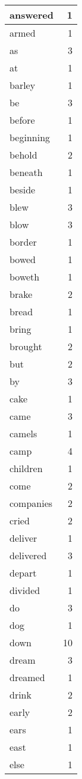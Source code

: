 \begin{center}
\begin{longtable}{l|r}
answered & 1\\ \hline 
armed & 1\\ \hline 
as & 3\\ \hline 
at & 1\\ \hline 
barley & 1\\ \hline 
be & 3\\ \hline 
before & 1\\ \hline 
beginning & 1\\ \hline 
behold & 2\\ \hline 
beneath & 1\\ \hline 
beside & 1\\ \hline 
blew & 3\\ \hline 
blow & 3\\ \hline 
border & 1\\ \hline 
bowed & 1\\ \hline 
boweth & 1\\ \hline 
brake & 2\\ \hline 
bread & 1\\ \hline 
bring & 1\\ \hline 
brought & 2\\ \hline 
but & 2\\ \hline 
by & 3\\ \hline 
cake & 1\\ \hline 
came & 3\\ \hline 
camels & 1\\ \hline 
camp & 4\\ \hline 
children & 1\\ \hline 
come & 2\\ \hline 
companies & 2\\ \hline 
cried & 2\\ \hline 
deliver & 1\\ \hline 
delivered & 3\\ \hline 
depart & 1\\ \hline 
divided & 1\\ \hline 
do & 3\\ \hline 
dog & 1\\ \hline 
down & 10\\ \hline 
dream & 3\\ \hline 
dreamed & 1\\ \hline 
drink & 2\\ \hline 
early & 2\\ \hline 
ears & 1\\ \hline 
east & 1\\ \hline 
else & 1\\ \hline 

\end{longtable}
\end{center}
